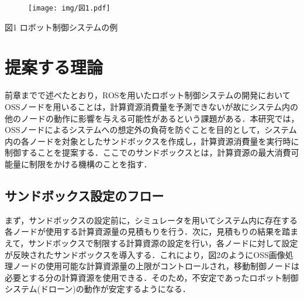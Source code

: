 \documentclass[11pt]{ujarticle} %
\begin{document}
\begin{figure}[h]
   \centering
   \texttt{[image: img/図1.pdf]}
\end{figure}
\begin{center}図1 ロボット制御システムの例\end{center}


\section{提案する理論}
前章までで述べたとおり，ROSを用いたロボット制御システムの開発においてOSSノードを用いることは，計算資源消費量を予測できないが故にシステム内の他のノードの動作に影響を与える可能性があるという課題がある．本研究では，OSSノードによるシステムへの想定外の負荷を防ぐことを目的として，システム内の各ノードを対象としたサンドボックスを作成し，計算資源消費量を実行時に制御することを提案する．ここでのサンドボックスとは，計算資源の最大消費可能量に制限をかける機構のことを指す．
\subsection{サンドボックス設定のフロー}
まず，サンドボックスの設定前に，シミュレータを用いてシステム内に存在する各ノードが使用する計算資源量の見積もりを行う．次に，見積もりの結果を踏まえて，サンドボックスで制限する計算資源の設定を行い，各ノードに対して設定が反映されたサンドボックスを導入する．これにより，図2のようにOSS画像処理ノードの使用可能な計算資源量の上限がコントロールされ，移動制御ノードは必要とする分の計算資源を使用できる．そのため，不安定であったロボット制御システム(ドローン)の動作が安定するようになる．
\end{document}
